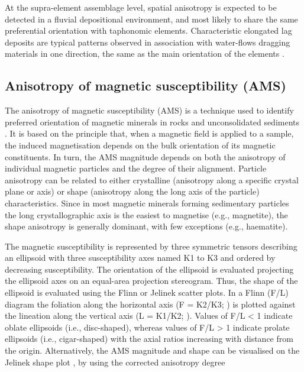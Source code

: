 \documentclass[5p,times,authoryear]{elsarticle}
\begin{document}
At the supra-element assemblage level, spatial anisotropy is expected to be detected in a fluvial depositional environment, and most likely to share the same preferential orientation with taphonomic elements. Characteristic elongated lag deposits are typical patterns observed in association with water-flows dragging materials in one direction, the same as the main orientation of the elements \citep{Dominguez-Rodrigo2012}.

\subsection{Anisotropy of magnetic susceptibility (AMS)}

The anisotropy of magnetic susceptibility (AMS) is a technique used to identify preferred orientation of magnetic minerals in rocks and unconsolidated sediments \citep{Hrouda1982,Tarling1993}. It is based on the principle that, when a magnetic field is applied to a sample, the induced magnetisation depends on the bulk orientation of its magnetic constituents. In turn, the AMS magnitude depends on both the anisotropy of individual magnetic particles and the degree of their alignment. Particle anisotropy can be related to either crystalline (anisotropy along a specific crystal plane or axis) or shape (anisotropy along the long axis of the particle) characteristics. Since in most magnetic minerals forming sedimentary particles the long crystallographic axis is the easiest to magnetise (e.g., magnetite), the shape anisotropy is generally dominant, with few exceptions (e.g., haematite).

The magnetic susceptibility is represented by three symmetric tensors describing an ellipsoid with three susceptibility axes named K1 to K3 and ordered by decreasing susceptibility. The orientation of the ellipsoid is evaluated projecting the ellipsoid axes on an equal-area projection stereogram. Thus, the shape of the ellipsoid is evaluated using the Flinn or Jelinek scatter plots. In a Flinn (F/L) diagram the foliation along the horizontal axis (F = K2/K3; \citealp{Stacey1960}) is plotted against the lineation along the vertical axis (L = K1/K2; \citealp{Balsey1960}). Values of F/L < 1 indicate oblate ellipsoids (i.e., disc-shaped), whereas values of F/L > 1 indicate prolate ellipsoids (i.e., cigar-shaped) with the axial ratios increasing with distance from the origin. Alternatively, the AMS magnitude and shape can be visualised on the Jelinek shape plot \citep{Jelinek1981}, by using the corrected anisotropy degree
\end{document}
